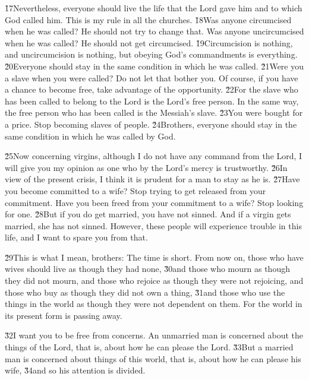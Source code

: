 \v{17}Nevertheless, everyone should live the life that the Lord gave him and to which God called him. This is my rule in all the churches. \v{18}Was anyone circumcised when he was called? He should not try to change that. Was anyone uncircumcised when he was called? He should not get circumcised. \v{19}Circumcision is nothing, and uncircumcision is nothing, but obeying God's commandments is everything. \v{20}Everyone should stay in the same condition in which he was called. \v{21}Were you a slave when you were called? Do not let that bother you. Of course, if you have a chance to become free, take advantage of the opportunity. \v{22}For the slave who has been called to belong to the Lord is the Lord's free person. In the same way, the free person who has been called is the Messiah's slave. \v{23}You were bought for a price. Stop becoming slaves of people. \v{24}Brothers, everyone should stay in the same condition in which he was called by God.

\v{25}Now concerning virgins, although I do not have any command from the Lord, I will give you my opinion as one who by the Lord's mercy is trustworthy. \v{26}In view of the present crisis, I think it is prudent for a man to stay as he is. \v{27}Have you become committed to a wife? Stop trying to get released from your commitment. Have you been freed from your commitment to a wife? Stop looking for one. \v{28}But if you do get married, you have not sinned. And if a virgin gets married, she has not sinned. However, these people will experience trouble in this life, and I want to spare you from that.

\v{29}This is what I mean, brothers: The time is short. From now on, those who have wives should live as though they had none, \v{30}and those who mourn as though they did not mourn, and those who rejoice as though they were not rejoicing, and those who buy as though they did not own a thing, \v{31}and those who use the things in the world as though they were not dependent on them. For the world in its present form is passing away.

\v{32}I want you to be free from concerns. An unmarried man is concerned about the things of the Lord, that is, about how he can please the Lord. \v{33}But a married man is concerned about things of this world, that is, about how he can please his wife, \v{34}and so his attention is divided.

